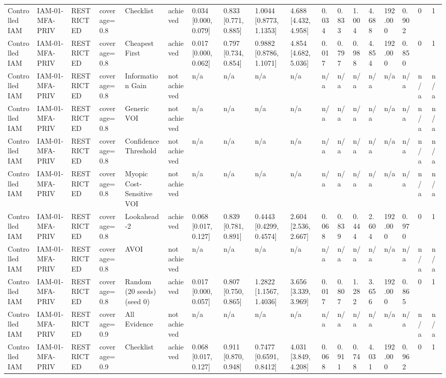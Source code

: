 \begin{table}[!ht]
{\begin{tabular}{llllllllllllllllll}
Controlled IAM & IAM-01-MFA-PRIV & RESTRICTED & coverage=0.8 & Checklist & achieved & 0.034 [0.000, 0.079] & 0.833 [0.771, 0.885] & 1.0044 [0.8773, 1.1353] & 4.688 [4.432, 4.958] & 0.034 & 0.833 & 1.004 & 4.688 & 192.000 & 0.902 & 0 & 1 \\
Controlled IAM & IAM-01-MFA-PRIV & RESTRICTED & coverage=0.8 & Cheapest First & achieved & 0.017 [0.000, 0.062] & 0.797 [0.734, 0.854] & 0.9882 [0.8786, 1.1071] & 4.854 [4.682, 5.036] & 0.017 & 0.797 & 0.988 & 4.854 & 192.000 & 0.850 & 0 & 1 \\
Controlled IAM & IAM-01-MFA-PRIV & RESTRICTED & coverage=0.8 & Information Gain & not achieved & n/a & n/a & n/a & n/a & n/a & n/a & n/a & n/a & n/a & n/a & n/a & n/a \\
Controlled IAM & IAM-01-MFA-PRIV & RESTRICTED & coverage=0.8 & Generic VOI & not achieved & n/a & n/a & n/a & n/a & n/a & n/a & n/a & n/a & n/a & n/a & n/a & n/a \\
Controlled IAM & IAM-01-MFA-PRIV & RESTRICTED & coverage=0.8 & Confidence Threshold & not achieved & n/a & n/a & n/a & n/a & n/a & n/a & n/a & n/a & n/a & n/a & n/a & n/a \\
Controlled IAM & IAM-01-MFA-PRIV & RESTRICTED & coverage=0.8 & Myopic Cost-Sensitive VOI & not achieved & n/a & n/a & n/a & n/a & n/a & n/a & n/a & n/a & n/a & n/a & n/a & n/a \\
Controlled IAM & IAM-01-MFA-PRIV & RESTRICTED & coverage=0.8 & Lookahead-2 & achieved & 0.068 [0.017, 0.127] & 0.839 [0.781, 0.891] & 0.4443 [0.4299, 0.4574] & 2.604 [2.536, 2.667] & 0.068 & 0.839 & 0.444 & 2.604 & 192.000 & 0.970 & 0 & 1 \\
Controlled IAM & IAM-01-MFA-PRIV & RESTRICTED & coverage=0.8 & AVOI & not achieved & n/a & n/a & n/a & n/a & n/a & n/a & n/a & n/a & n/a & n/a & n/a & n/a \\
Controlled IAM & IAM-01-MFA-PRIV & RESTRICTED & coverage=0.8 & Random (20 seeds) (seed 0) & achieved & 0.017 [0.000, 0.057] & 0.807 [0.750, 0.865] & 1.2822 [1.1567, 1.4036] & 3.656 [3.339, 3.969] & 0.017 & 0.807 & 1.282 & 3.656 & 192.000 & 0.865 & 0 & 1 \\
Controlled IAM & IAM-01-MFA-PRIV & RESTRICTED & coverage=0.9 & All Evidence & not achieved & n/a & n/a & n/a & n/a & n/a & n/a & n/a & n/a & n/a & n/a & n/a & n/a \\
Controlled IAM & IAM-01-MFA-PRIV & RESTRICTED & coverage=0.9 & Checklist & achieved & 0.068 [0.017, 0.127] & 0.911 [0.870, 0.948] & 0.7477 [0.6591, 0.8412] & 4.031 [3.849, 4.208] & 0.068 & 0.911 & 0.748 & 4.031 & 192.000 & 0.962 & 0 & 1 \\

\end{tabular}}
\end{table}
